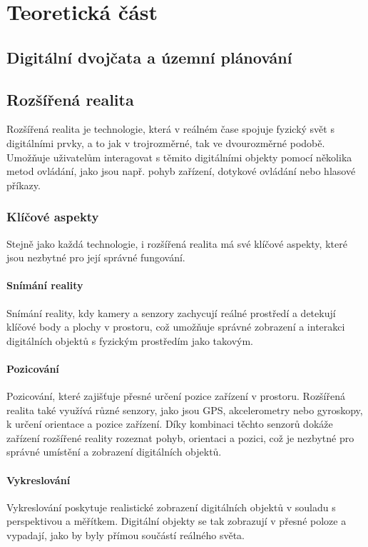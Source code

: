 \chapter{Teoretická část}
\section{Digitální dvojčata a územní plánování}
\section{Rozšířená realita}
Rozšířená realita je technologie, která v reálném čase spojuje fyzický svět s digitálními prvky, a to jak v trojrozměrné, tak ve dvourozměrné podobě. Umožňuje uživatelům interagovat s těmito digitálními objekty pomocí několika metod ovládání, jako jsou např. pohyb zařízení, dotykové ovládání nebo hlasové příkazy. \cite{AROverview}
\subsection{Klíčové aspekty}
Stejně jako každá technologie, i rozšířená realita má své klíčové aspekty, které jsou nezbytné pro její správné fungování.
\subsubsection{Snímání reality}
Snímání reality, kdy kamery a senzory zachycují reálné prostředí a detekují klíčové body a plochy v prostoru, což umožňuje správné zobrazení a interakci digitálních objektů s fyzickým prostředím jako takovým. \cite{AROverview}
\subsubsection{Pozicování}
Pozicování, které zajišťuje přesné určení pozice zařízení v prostoru. Rozšířená realita také využívá různé senzory, jako jsou GPS, akcelerometry nebo gyroskopy, k určení orientace a pozice zařízení. Díky kombinaci těchto senzorů dokáže zařízení rozšířené reality rozeznat pohyb, orientaci a pozici, což je nezbytné pro správné umístění a zobrazení digitálních objektů. \cite{AROverview}
\subsubsection{Vykreslování}
Vykreslování poskytuje realistické zobrazení digitálních objektů v souladu s perspektivou a měřítkem. Digitální objekty se tak zobrazují v přesné poloze a vypadají, jako by byly přímou součástí reálného světa. \cite{AROverview} \\
